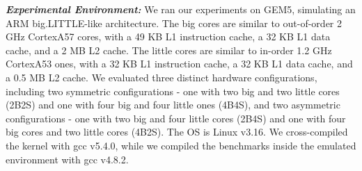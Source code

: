  \begin{table}[htbp]
  \caption{Benchmarks Characteristics \cite{bienia08characterization}\cite{woo1995splash}\cite{southern2016analysis}}
  \center
  \label{BC}
\end{table}

\textbf{\textit{Experimental Environment:}} We ran our experiments on GEM5, simulating an ARM big.LITTLE-like architecture. The big cores are similar to out-of-order 2 GHz CortexA57 cores, with a 49 KB L1 instruction cache, a 32 KB L1 data cache, and a 2 MB L2 cache. The little cores are similar to in-order 1.2 GHz CortexA53 ones, with a 32 KB L1 instruction cache, a 32 KB L1 data cache, and a 0.5 MB L2 cache. We evaluated three distinct hardware configurations, including two symmetric configurations - one with two big and two little cores (2B2S) and one with four big and four little ones (4B4S), and two asymmetric configurations - one with two big and four little cores (2B4S) and one with four big cores and two little cores (4B2S). The OS is Linux v3.16. We cross-compiled the kernel with gcc v5.4.0, while we compiled the benchmarks inside the emulated environment with gcc v4.8.2.

